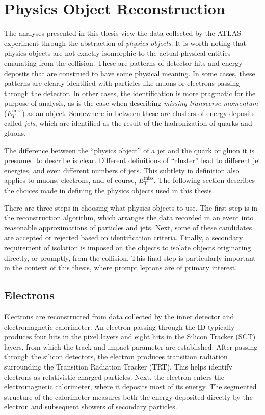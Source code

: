 
\section{Physics Object Reconstruction}\label{sec:physObjects}
The analyses presented in this thesis view the data collected by the ATLAS experiment through the abstraction of \emph{physics objects}.
It is worth noting that physics objects are not exactly isomorphic to the actual physical entities emanating from the collision.
These are patterns of detector hits and energy deposits that are construed to have some physical meaning.
In some cases, these patterns are clearly identified with particles like muons or electrons passing through the detector.
In other cases, the identification is more pragmatic for the purpose of analysis, as is the case when describing \emph{missing transverse momentum} ($E_T^\text{miss}$) as an object.
Somewhere in between these are clusters of energy deposits called \emph{jets}, which are identified as the result of the hadronization of quarks and gluons.

The difference between the ``physics object'' of a jet and the quark or gluon it is presumed to describe is clear.
Different definitions of ``cluster'' lead to different jet energies, and even different numbers of jets.
This subtlety in definition also applies to muons, electrons, and of course, $E_T^\text{miss}$.
The following section describes the choices made in defining the physics objects used in this thesis.

There are three steps in choosing what physics objects to use.
The first step is in the reconstruction algorithm, which arranges the data recorded in an event into reasonable approximations of particles and jets.
Next, some of these candidates are accepted or rejected based on identification criteria.
Finally, a secondary requirement of isolation is imposed on the objects to isolate objects originating directly, or promptly, from the collision.
This final step is particularly important in the context of this thesis, where prompt leptons are of primary interest.

\subsection{Electrons}
Electrons are reconstructed from data collected by the inner detector and electromagnetic calorimeter.
An electron passing through the ID typically produces four hits in the pixel layers and eight hits in the Silicon Tracker (SCT) layers, from which the track and impact parameter are established.
After passing through the silicon detectors, the electron produces transition radiation surrounding the Transition Radiation Tracker (TRT).
This helps identify electrons as relativistic charged particles.
Next, the electron enters the electromagnetic calorimeter, where it deposits most of its energy.
The segmented structure of the calorimeter measures both the energy deposited directly by the electron and subsequent showers of secondary particles.

